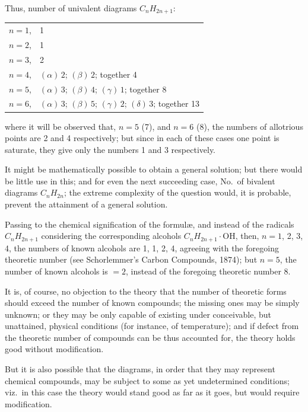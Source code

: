 \documentclass[11pt,a4paper]{article}
\theoremstyle{plain}
\theoremstyle{definition}
\theoremstyle{remark}
\begin{document}
Thus, number of univalent diagrams $C_n H_{2n+1}$:
\begin{center}
\begin{tabular}{ll}
$n = 1$, & 1 \\
$n = 2$, & 1 \\
$n = 3$, & 2 \\
$n = 4$, & $(\alpha)\, 2$; $(\beta)\, 2$; together 4 \\
$n = 5$, & $(\alpha)\, 3$; $(\beta)\, 4$; $(\gamma)\, 1$; together 8 \\
$n = 6$, & $(\alpha)\, 3$; $(\beta)\, 5$; $(\gamma)\, 2$; $(\delta)\, 3$; together 13
\end{tabular}
\end{center}

where it will be observed that, $n = 5$ (7), and $n = 6$ (8), the numbers of allotrious points are 2 and 4 respectively; but since in each of these cases one point is saturate, they give only the numbers 1 and 3 respectively.

It might be mathematically possible to obtain a general solution; but there would be little use in this; and for even the next succeeding case, No.\ of bivalent diagrams $C_n H_{2n}$; the extreme complexity of the question would, it is probable, prevent the attainment of a general solution.

Passing to the chemical signification of the formul\ae, and instead of the radicals $C_n H_{2n+1}$ considering the corresponding alcohols $C_n H_{2n+1} \cdot \mathrm{OH}$, then, $n = 1$, 2, 3, 4, the numbers of known alcohols are 1, 1, 2, 4, agreeing with the foregoing theoretic number (see Schorlemmer's Carbon Compounds, 1874); but $n = 5$, the number of known alcohols is $= 2$, instead of the foregoing theoretic number 8.

It is, of course, no objection to the theory that the number of theoretic forms should exceed the number of known compounds; the missing ones may be simply unknown; or they may be only capable of existing under conceivable, but unattained, physical conditions (for instance, of temperature); and if defect from the theoretic number of compounds can be thus accounted for, the theory holds good without modification.

But it is also possible that the diagrams, in order that they may represent chemical compounds, may be subject to some as yet undetermined conditions; viz.\ in this case the theory would stand good as far as it goes, but would require modification.

\newpage
\end{document}
